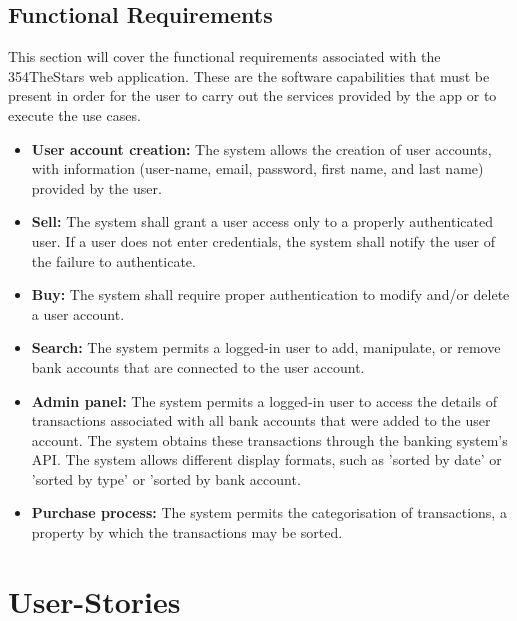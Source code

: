 \documentclass[11pt]{article}
\newcounter{use case ID}
\newcounter{req ID}
\begin{document}
\subsection{Functional Requirements} \label{func req}

This section will cover the functional requirements associated with the 354TheStars web application. These are the software capabilities that must be present in order for the user to carry out the services provided by the app or to execute the use cases.

\begin{itemize}
    \item  \textbf{User account creation:} The system allows the creation of user accounts, with information (user-name, email, password, first name, and last name) provided by the user.
    \item \textbf{Sell:} The system shall grant a user access only to a properly authenticated user. If a user does not enter credentials, the system shall notify the user of the failure to authenticate.
    \item \textbf{Buy:} The system shall require proper authentication to modify and/or delete a user account.
    \item  \textbf{Search:} The system permits a logged-in user to add, manipulate, or remove bank accounts that are connected to the user account.
    \item  \textbf{Admin panel:} The system permits a logged-in user to access the details of transactions associated with all bank accounts that were added to the user account. The system obtains these transactions through the banking system's API. The system allows different display formats, such as 'sorted by date' or 'sorted by type' or 'sorted by bank account.
    \item \textbf{Purchase process:} The system permits the categorisation of transactions, a property by which the transactions may be sorted.
\end{itemize}

\clearpage

\section{User-Stories}
\end{document}
